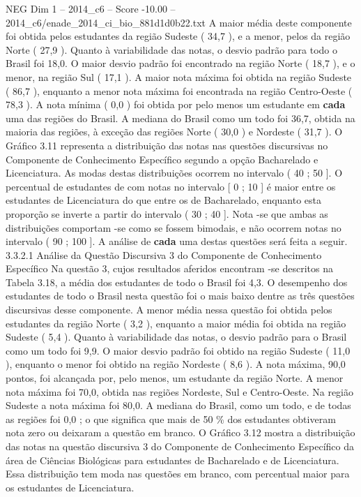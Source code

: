 \begin{textsample}{NEG Dim 1 – 2014\_c6 – Score -10.00 – 2014\_c6/enade\_2014\_ci\_bio\_881d1d0b22.txt}
A maior média deste componente foi obtida pelos estudantes da região Sudeste ( 34,7 ), e a menor, pelos da região Norte ( 27,9 ).
Quanto à variabilidade das notas, o desvio padrão para todo o Brasil foi 18,0.
O maior desvio padrão foi encontrado na região Norte ( 18,7 ), e o menor, na região Sul ( 17,1 ).
A maior nota máxima foi obtida na região Sudeste ( 86,7 ), enquanto a menor nota máxima foi encontrada na região Centro-Oeste ( 78,3 ).
A nota mínima ( 0,0 ) foi obtida por pelo menos um estudante em \textbf{cada} uma das regiões do Brasil.
A mediana do Brasil como um todo foi 36,7, obtida na maioria das regiões, à exceção das regiões Norte ( 30,0 ) e Nordeste ( 31,7 ).
O Gráfico 3.11 representa a distribuição das notas nas questões discursivas no Componente de Conhecimento Específico segundo a opção Bacharelado e Licenciatura.
As modas destas distribuições ocorrem no intervalo ( 40 ; 50 ].
O percentual de estudantes de com notas no intervalo [ 0 ; 10 ] é maior entre os estudantes de Licenciatura do que entre os de Bacharelado, enquanto esta proporção se inverte a partir do intervalo ( 30 ; 40 ].
Nota -se que ambas as distribuições comportam -se como se fossem bimodais, e não ocorrem notas no intervalo ( 90 ; 100 ].
A análise de \textbf{cada} uma destas questões será feita a seguir. 3.3.2.1 Análise da Questão Discursiva 3 do Componente de Conhecimento Específico Na questão 3, cujos resultados aferidos encontram -se descritos na Tabela 3.18, a média dos estudantes de todo o Brasil foi 4,3.
O desempenho dos estudantes de todo o Brasil nesta questão foi o mais baixo dentre as três questões discursivas desse componente.
A menor média nessa questão foi obtida pelos estudantes da região Norte ( 3,2 ), enquanto a maior média foi obtida na região Sudeste ( 5,4 ).
Quanto à variabilidade das notas, o desvio padrão para o Brasil como um todo foi 9,9.
O maior desvio padrão foi obtido na região Sudeste ( 11,0 ), enquanto o menor foi obtido na região Nordeste ( 8,6 ).
A nota máxima, 90,0 pontos, foi alcançada por, pelo menos, um estudante da região Norte.
A menor nota máxima foi 70,0, obtida nas regiões Nordeste, Sul e Centro-Oeste.
Na região Sudeste a nota máxima foi 80,0.
A mediana do Brasil, como um todo, e de todas as regiões foi 0,0 ; o que significa que mais de 50 \% dos estudantes obtiveram nota zero ou deixaram a questão em branco.
O Gráfico 3.12 mostra a distribuição das notas na questão discursiva 3 do Componente de Conhecimento Específico da área de Ciências Biológicas para estudantes de Bacharelado e de Licenciatura.
Essa distribuição tem moda nas questões em branco, com percentual maior para os estudantes de Licenciatura.

\end{textsample}
